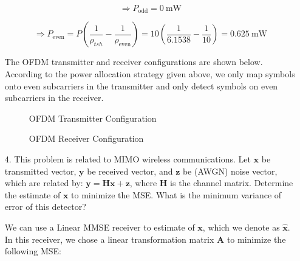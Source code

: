 \documentclass[fleqn]{article}
\begin{document}
\begin{enumerate}
		\begin{equation*}
			\Rightarrow P_{\text{odd}} = 0\ \text{mW}
		\end{equation*}
		
		\begin{equation*}
			\Rightarrow P_{\text{even}} = P\left(\frac{1}{\rho_{tsh}} - \frac{1}{\rho_{\text{even}}}\right) = 10\left(\frac{1}{6.1538} - \frac{1}{10}\right) = 0.625\ \text{mW}
		\end{equation*}		
		
		The OFDM transmitter and receiver configurations are shown below. According to the power allocation strategy given above, we only map symbols onto even subcarriers in the transmitter and only detect symbols on even subcarriers in the receiver.
		
		\begin{figure}[H]
			\centerline{}
			\caption{OFDM Transmitter Configuration}
			\label{fig::ofdm_tx_config}
		\end{figure}
		
		\begin{figure}[H]
			\centerline{}
			\caption{OFDM Receiver Configuration}
			\label{fig::ofdm_rx_config}
		\end{figure}
		
		\item[4.] This problem is related to MIMO wireless communications. Let $\mathbf{x}$ be transmitted vector, $\mathbf{y}$ be received vector, and $\mathbf{z}$ be (AWGN) noise vector, which are related by: $\mathbf{y}=\mathbf{Hx} + \mathbf{z}$, where $\mathbf{H}$ is the channel matrix. Determine the estimate of $\mathbf{x}$ to minimize the MSE. What is the minimum variance of error of this detector?
		
		We can use a Linear MMSE receiver to estimate of $\mathbf{x}$, which we denote as $\mathbf{\hat{x}}$. In this receiver, we chose a linear transformation matrix $\mathbf{A}$ to minimize the following MSE:
		

\end{enumerate}
\end{document}
